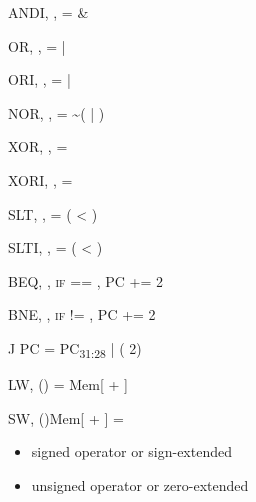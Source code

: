 \begin{mipsinsn}{ANDI}{\rt{}, \rs{}, }{\rt{} = \rs{} \& \mipsu{}}
\end{mipsinsn}

\begin{mipsinsn}{OR}{\rd{}, \rs{}, \rt{}}{\rd{} = \rs{} | \rt{}}
\end{mipsinsn}

\begin{mipsinsn}{ORI}{\rt{}, \rs{}, }{\rt{} = \rs{} | \mipsu{}}
\end{mipsinsn}

\begin{mipsinsn}{NOR}{\rd{}, \rs{}, \rt{}}{\rd{} = \textasciitilde(\rs{} | \rt{})}
\end{mipsinsn}

\begin{mipsinsn}{XOR}{\rd{}, \rs{}, \rt{}}{\rd{} = \rs{} \opxor{} \rt{}}
\end{mipsinsn}

\begin{mipsinsn}{XORI}{\rt{}, \rs{}, }{\rt{} = \rs{} \opxor{} \mipsu{}}
\end{mipsinsn}

\begin{mipsinsn}{SLT}{\rd{}, \rs{}, \rt{}}{\rd{} = (\rs{} \textless{} \rt{})}
\end{mipsinsn}

\begin{mipsinsn}{SLTI}{\rt{}, \rs{}, }{\rt{} = (\rs{} \textless{} \mipss{})}
\end{mipsinsn}

\begin{mipsinsn}{BEQ}{\rs{}, \rt{}, }{
		\textsc{if} \rs{} == \rt{}, PC += \mipss{} \opsl{} 2
	}
\end{mipsinsn}

\begin{mipsinsn}{BNE}{\rs{}, \rt{}, }{
		\textsc{if} \rs{} != \rt{}, PC += \mipss{} \opsl{} 2
	}
\end{mipsinsn}

\begin{mipsinsn}{J}{}{
		PC = PC\textsubscript{31:28} | ( \opsl{} 2)
	}
\end{mipsinsn}

\begin{mipsinsn}{LW}{\rt{}, (\rs{})}{\rt{} = Mem[\rs{} + \mipss{}]}
\end{mipsinsn}

\begin{mipsinsn}{SW}{\rt{}, (\rs{})}{Mem[\rs{} + \mipss{}] = \rt{}}
\end{mipsinsn}

\begin{itemize}
	\footnotesize
	\item[\textpm] signed operator or sign-extended
	\item[\textzerooldstyle] unsigned operator or zero-extended
\end{itemize}
